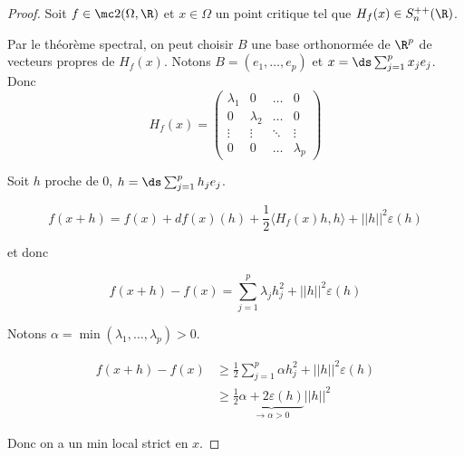 \begin{proof}
    Soit $f \in \mc 2 (\Omega, \R)$ et $x \in \Omega$ un point 
    critique tel que $H_f(x) \in S_n^{++}(\R)$.

    Par le théorème spectral, on peut choisir $B$ une base orthonormée de $\R^p$
    de vecteurs propres de $H_f(x)$. Notons $B = (e_1, \ldots, e_p)$ et
    $x = \ds \sum_{j = 1 }^{p } x_j e_j$.
    Donc 
    $$H_f(x) = \begin{pmatrix}
        \lambda_1 & 0 & \ldots & 0 \\
        0 & \lambda_2 & \ldots & 0 \\
        \vdots & \vdots & \ddots & \vdots \\
        0 & 0 & \ldots & \lambda_p
    \end{pmatrix}$$

    Soit $h$ proche de $0$, $h = \ds \sum_{j = 1}^{p } h_j e_j$.

    $$f(x + h) = f(x) + df(x)(h) + \frac 1 2 \langle H_f(x) h, h \rangle + ||h||^2 \varepsilon(h)$$

    et donc 

    $$f(x + h) - f(x) = \sum_{j = 1}^{p } \lambda_j h_j^2 + ||h||^2 \varepsilon(h)$$


    Notons $\alpha = \min(\lambda_1, \ldots, \lambda_p) > 0$.

    \begin{align}
        f(x + h) - f(x) & \geqslant \frac 1 2 \sum_{j = 1 }^{p } \alpha h_j^2 + ||h||^2 \varepsilon(h) \\
        & \geqslant \frac 1 2 \underbrace{\alpha + 2 \varepsilon(h)}_{\to \alpha > 0} ||h||^2
    \end{align}

    Donc on a un min local strict en $x$.
\end{proof}

